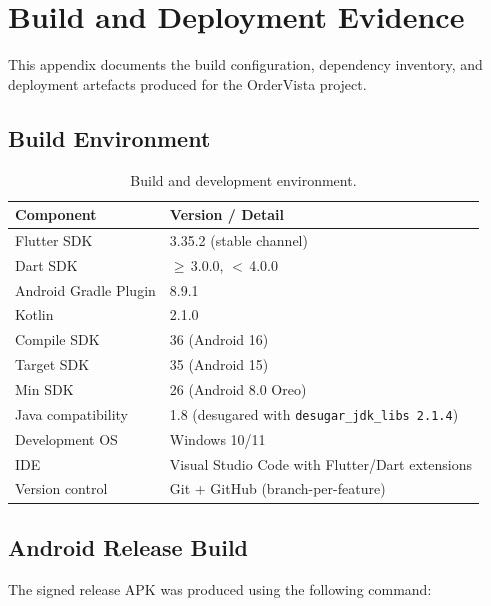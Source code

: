 \chapter{Build and Deployment Evidence}
\label{app:build}

This appendix documents the build configuration, dependency inventory, and
deployment artefacts produced for the OrderVista project.

\section{Build Environment}

\begin{table}[H]
\centering
\caption{Build and development environment.}
\label{tab:build-env}
\begin{tabular}{@{}ll@{}}
\toprule
\textbf{Component} & \textbf{Version / Detail}\\
\midrule
Flutter SDK       & 3.35.2 (stable channel) \\
Dart SDK          & $\geq$\,3.0.0, $<$\,4.0.0 \\
Android Gradle Plugin & 8.9.1 \\
Kotlin            & 2.1.0 \\
Compile SDK       & 36 (Android 16) \\
Target SDK        & 35 (Android 15) \\
Min SDK           & 26 (Android 8.0 Oreo) \\
Java compatibility & 1.8 (desugared with \texttt{desugar\_jdk\_libs 2.1.4}) \\
Development OS    & Windows 10/11 \\
IDE               & Visual Studio Code with Flutter/Dart extensions \\
Version control   & Git + GitHub (branch-per-feature) \\
\bottomrule
\end{tabular}
\end{table}

\section{Android Release Build}

The signed release APK was produced using the following command:

